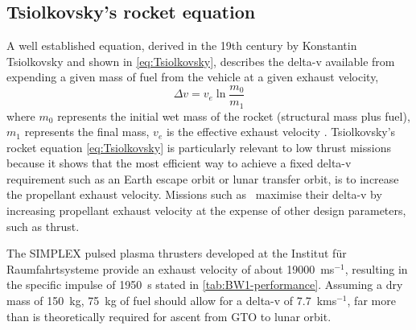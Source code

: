 \subsection{Tsiolkovsky's rocket equation} \label{sec:Tsiolkovsky}

A well established equation, derived in the 19th century by Konstantin Tsiolkovsky and shown in \eqref{eq:Tsiolkovsky}, describes the delta-v available from expending a given mass of fuel from the vehicle at a given exhaust velocity,
\begin{equation}\label{eq:Tsiolkovsky}
\Delta v=v_{e}\ln\frac{m_{0}}{m_{1}}
\end{equation}
where $m_{0}$ represents the initial wet mass of the rocket (structural mass plus fuel), $m_{1}$ represents the final mass, $v_{e}$ is the effective exhaust velocity \parencite{Tsiolkovsky1903,Chobotov2002}. Tsiolkovsky's rocket equation \eqref{eq:Tsiolkovsky} is particularly relevant to low thrust missions because it shows that the most efficient way to achieve a fixed delta-v requirement such as an Earth escape orbit or lunar transfer orbit, is to increase the propellant exhaust velocity. Missions such as \BW\ maximise their delta-v by increasing propellant exhaust velocity at the expense of other design parameters, such as thrust.

The SIMPLEX pulsed plasma thrusters developed at the Institut f\"{u}r Raumfahrtsysteme \parencite{Nawaz2008} provide an exhaust velocity of about 19000~ms$^{-1}$, resulting in the specific impulse of 1950~s stated in \autoref{tab:BW1-performance}. Assuming a dry mass of 150~kg, 75~kg of fuel should allow for a delta-v of 7.7~kms$^{-1}$, far more than is theoretically required for ascent from GTO to lunar orbit.




